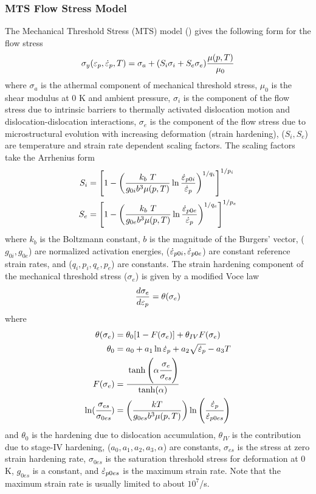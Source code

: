   \subsubsection{MTS Flow Stress Model}
  The Mechanical Threshold Stress (MTS) model
  (\cite{Follans88,Goto00a,Kocks01})
  gives the following form for the flow stress
  \begin{equation}
    \sigma_y(\varepsilon_p,\dot{\varepsilon}_{p},T) = 
      \sigma_a + (S_i \sigma_i + S_e \sigma_e)\frac{\mu(p,T)}{\mu_0} 
  \end{equation}
  where $\sigma_a$ is the athermal component of mechanical threshold stress,
  $\mu_0$ is the shear modulus at 0 K and ambient pressure,
  $\sigma_i$ is the component of the flow stress due to intrinsic barriers
  to thermally activated dislocation motion and dislocation-dislocation
  interactions, $\sigma_e$ is the component of the flow stress due to
  microstructural evolution with increasing deformation (strain hardening),
  ($S_i, S_e$) are temperature and strain rate dependent scaling factors.  The
  scaling factors take the Arrhenius form
  \begin{align}
    S_i & = \left[1 - \left(\frac{k_b~T}{g_{0i}b^3\mu(p,T)}
    \ln\frac{\dot{\varepsilon}_{p0i}}{\dot{\varepsilon}_{p}}\right)^{1/q_i}
    \right]^{1/p_i} \\
    S_e & = \left[1 - \left(\frac{k_b~T}{g_{0e}b^3\mu(p,T)}
    \ln\frac{\dot{\varepsilon}_{p0e}}{\dot{\varepsilon}_{p}}\right)^{1/q_e}
    \right]^{1/p_e}
  \end{align}
  where $k_b$ is the Boltzmann constant, $b$ is the magnitude of the Burgers'
  vector, ($g_{0i}, g_{0e}$) are normalized activation energies,
  ($\dot{\varepsilon}_{p0i}, \dot{\varepsilon}_{p0e}$) are constant reference strain rates, and
  ($q_i, p_i, q_e, p_e$) are constants.  The strain hardening component
  of the mechanical threshold stress ($\sigma_e$) is given by a
  modified Voce law
  \begin{equation}\label{eq:MTSsige}
    \frac{d\sigma_e}{d\varepsilon_p} = \theta(\sigma_e)
  \end{equation}
  where
  \begin{align}
    \theta(\sigma_e) & = 
       \theta_0 [ 1 - F(\sigma_e)] + \theta_{IV} F(\sigma_e) \\
    \theta_0 & = a_0 + a_1 \ln \dot{\varepsilon}_{p} + a_2 \sqrt{\dot{\varepsilon}_{p}} - a_3 T \\
    F(\sigma_e) & = 
      \cfrac{\tanh\left(\alpha \cfrac{\sigma_e}{\sigma_{es}}\right)}
      {\tanh(\alpha)}\\
    \ln(\cfrac{\sigma_{es}}{\sigma_{0es}}) & =
    \left(\frac{kT}{g_{0es} b^3 \mu(p,T)}\right)
    \ln\left(\cfrac{\dot{\varepsilon}_{p}}{\dot{\varepsilon}_{p0es}}\right)
  \end{align}
  and $\theta_0$ is the hardening due to dislocation accumulation,
  $\theta_{IV}$ is the contribution due to stage-IV hardening,
  ($a_0, a_1, a_2, a_3, \alpha$) are constants,
  $\sigma_{es}$ is the stress at zero strain hardening rate,
  $\sigma_{0es}$ is the saturation threshold stress for deformation at 0 K,
  $g_{0es}$ is a constant, and $\dot{\varepsilon}_{p0es}$ is the maximum strain rate.  Note
  that the maximum strain rate is usually limited to about $10^7$/s.

